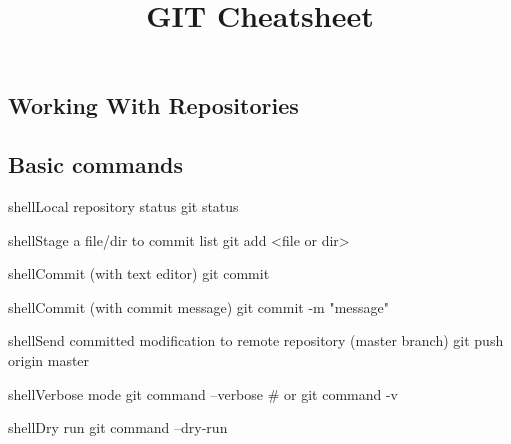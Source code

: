 \documentclass[10pt,a4paper]{article}
\title{\color{w3schools}GIT Cheatsheet
}
\begin{document}
\maketitle

\small
\begin{multicols}{3}

\thispagestyle{empty}
\scriptsize



{\centering\section{Working With Repositories}}

\subsection{Basic commands}

\begin{codebox}{shell}{Local repository status}
git status

\end{codebox}

\begin{codebox}{shell}{Stage a file/dir to commit list}
git add <file or dir>

\end{codebox}

\begin{codebox}{shell}{Commit (with text editor)}
git commit

\end{codebox}

\begin{codebox}{shell}{Commit (with commit message)}
git commit -m "message"

\end{codebox}

\begin{codebox}{shell}{Send committed modification to remote repository (master branch)}
git push origin master

\end{codebox}

\begin{codebox}{shell}{Verbose mode}
git command --verbose
# or 
git command -v

\end{codebox}

\begin{codebox}{shell}{Dry run}
git command --dry-run

\end{codebox}


\end{multicols}
\end{document}
